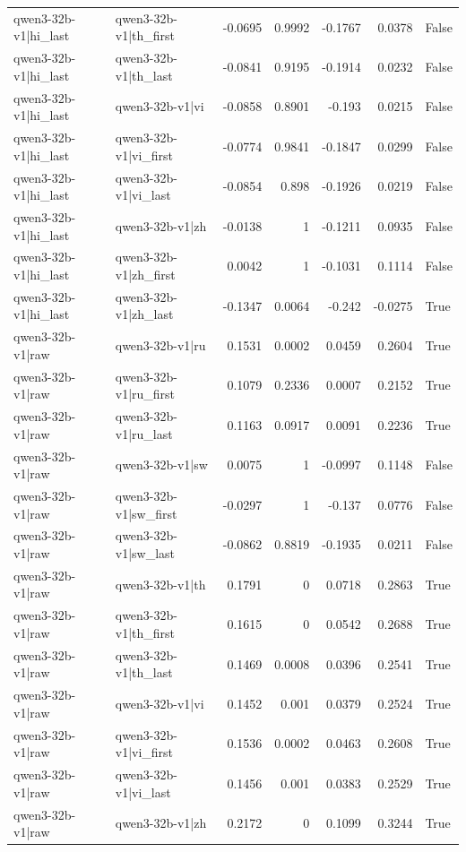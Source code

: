 \begin{table}
\begin{tabular}{l l r r r r l}
qwen3-32b-v1|hi_last & qwen3-32b-v1|th_first & -0.0695 & 0.9992 & -0.1767 & 0.0378 & False \\
qwen3-32b-v1|hi_last & qwen3-32b-v1|th_last & -0.0841 & 0.9195 & -0.1914 & 0.0232 & False \\
qwen3-32b-v1|hi_last & qwen3-32b-v1|vi & -0.0858 & 0.8901 & -0.193 & 0.0215 & False \\
qwen3-32b-v1|hi_last & qwen3-32b-v1|vi_first & -0.0774 & 0.9841 & -0.1847 & 0.0299 & False \\
qwen3-32b-v1|hi_last & qwen3-32b-v1|vi_last & -0.0854 & 0.898 & -0.1926 & 0.0219 & False \\
qwen3-32b-v1|hi_last & qwen3-32b-v1|zh & -0.0138 & 1 & -0.1211 & 0.0935 & False \\
qwen3-32b-v1|hi_last & qwen3-32b-v1|zh_first & 0.0042 & 1 & -0.1031 & 0.1114 & False \\
qwen3-32b-v1|hi_last & qwen3-32b-v1|zh_last & -0.1347 & 0.0064 & -0.242 & -0.0275 & True \\
qwen3-32b-v1|raw & qwen3-32b-v1|ru & 0.1531 & 0.0002 & 0.0459 & 0.2604 & True \\
qwen3-32b-v1|raw & qwen3-32b-v1|ru_first & 0.1079 & 0.2336 & 0.0007 & 0.2152 & True \\
qwen3-32b-v1|raw & qwen3-32b-v1|ru_last & 0.1163 & 0.0917 & 0.0091 & 0.2236 & True \\
qwen3-32b-v1|raw & qwen3-32b-v1|sw & 0.0075 & 1 & -0.0997 & 0.1148 & False \\
qwen3-32b-v1|raw & qwen3-32b-v1|sw_first & -0.0297 & 1 & -0.137 & 0.0776 & False \\
qwen3-32b-v1|raw & qwen3-32b-v1|sw_last & -0.0862 & 0.8819 & -0.1935 & 0.0211 & False \\
qwen3-32b-v1|raw & qwen3-32b-v1|th & 0.1791 & 0 & 0.0718 & 0.2863 & True \\
qwen3-32b-v1|raw & qwen3-32b-v1|th_first & 0.1615 & 0 & 0.0542 & 0.2688 & True \\
qwen3-32b-v1|raw & qwen3-32b-v1|th_last & 0.1469 & 0.0008 & 0.0396 & 0.2541 & True \\
qwen3-32b-v1|raw & qwen3-32b-v1|vi & 0.1452 & 0.001 & 0.0379 & 0.2524 & True \\
qwen3-32b-v1|raw & qwen3-32b-v1|vi_first & 0.1536 & 0.0002 & 0.0463 & 0.2608 & True \\
qwen3-32b-v1|raw & qwen3-32b-v1|vi_last & 0.1456 & 0.001 & 0.0383 & 0.2529 & True \\
qwen3-32b-v1|raw & qwen3-32b-v1|zh & 0.2172 & 0 & 0.1099 & 0.3244 & True \\

\end{tabular}
\end{table}
